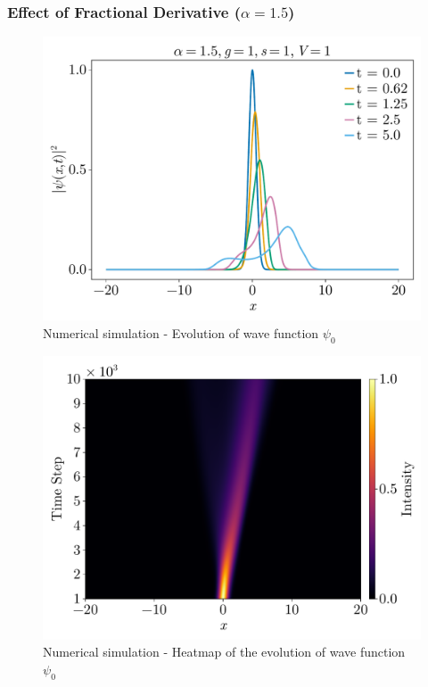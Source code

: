 \documentclass[8pt, a4paper, twocolumn]{article}
\begin{document}
\subsubsection{Effect of Fractional Derivative ($\alpha = 1.5$)}

\begin{figure}[h!]
	\centering
	\includegraphics[width=\linewidth]{../figs/fnlse_evolution_01.pdf}
	\caption{Numerical simulation - Evolution of wave function $\psi_0$}
	\label{fig:nnfse_evolution_alpha01}
\end{figure}
\begin{figure}[h!]
	\centering
	\includegraphics[width=\linewidth]{../figs/fnlse_heatmap_01.pdf}
	\caption{Numerical simulation - Heatmap of the evolution of wave function $\psi_0$}
	\label{fig:nnfse_heatmap_alpha01}
\end{figure}
\end{document}
